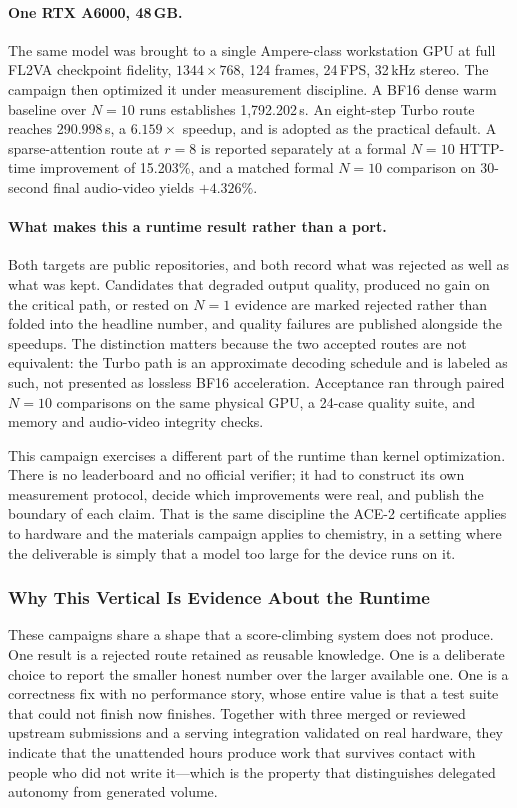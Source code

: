 \paragraph{One RTX A6000, 48\,GB.}
The same model was brought to a single Ampere-class workstation GPU at full FL2VA
checkpoint fidelity, $1344\times768$, 124 frames, 24\,FPS, 32\,kHz stereo. The
campaign then optimized it under measurement discipline. A BF16 dense warm baseline
over $N{=}10$ runs establishes 1{,}792.202\,s. An eight-step Turbo route reaches
290.998\,s, a $6.159\times$ speedup, and is adopted as the practical default. A
sparse-attention route at $r{=}8$ is reported separately at a formal $N{=}10$
HTTP-time improvement of 15.203\%, and a matched formal $N{=}10$ comparison on
30-second final audio-video yields $+4.326\%$.

\paragraph{What makes this a runtime result rather than a port.}
Both targets are public repositories, and both record what was rejected as well as
what was kept. Candidates that degraded output quality, produced no gain on the
critical path, or rested on $N{=}1$ evidence are marked rejected rather than folded
into the headline number, and quality failures are published alongside the speedups.
The distinction matters because the two accepted routes are not equivalent: the
Turbo path is an approximate decoding schedule and is labeled as such, not presented
as lossless BF16 acceleration. Acceptance ran through paired $N{=}10$ comparisons on
the same physical GPU, a 24-case quality suite, and memory and audio-video integrity
checks.

This campaign exercises a different part of the runtime than kernel optimization.
There is no leaderboard and no official verifier; it had to construct its own
measurement protocol, decide which improvements were real, and publish the boundary
of each claim. That is the same discipline the ACE-2 certificate applies to hardware
and the materials campaign applies to chemistry, in a setting where the deliverable
is simply that a model too large for the device runs on it.

\subsubsection{Why This Vertical Is Evidence About the Runtime}

These campaigns share a shape that a score-climbing system does not produce. One
result is a rejected route retained as reusable knowledge. One is a deliberate
choice to report the smaller honest number over the larger available one. One is a
correctness fix with no performance story, whose entire value is that a test suite
that could not finish now finishes. Together with three merged or reviewed upstream
submissions and a serving integration validated on real hardware, they indicate that
the unattended hours produce work that survives contact with people who did not
write it---which is the property that distinguishes delegated autonomy from
generated volume.
